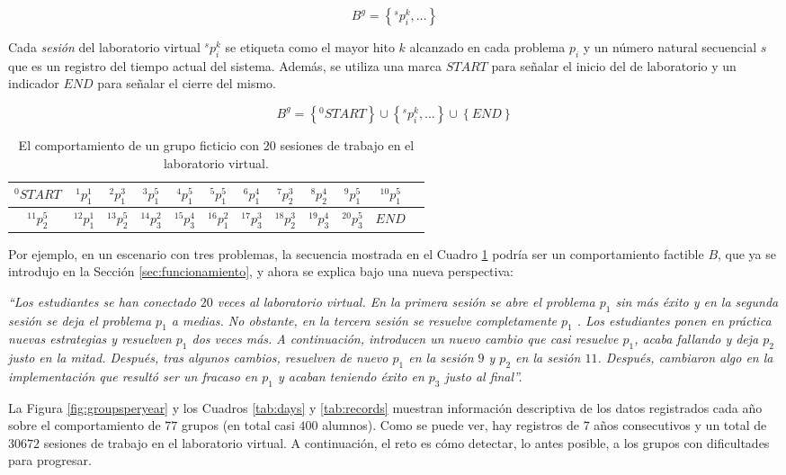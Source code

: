 \begin{equation}
B^g = \left\lbrace ^sp_i^k,\dots \right\rbrace
\end{equation}

Cada \emph{sesión} del laboratorio virtual $^sp_i^k$ se etiqueta como el mayor hito $k$ alcanzado en cada problema $p_i$ y un número natural secuencial $s$ que es un registro del tiempo actual del sistema. Además, se utiliza una marca $START$ para señalar el inicio del de laboratorio y un indicador $END$ para señalar el cierre del mismo.

\begin{equation}
B^g = \left\lbrace ^0START \right\rbrace \cup \left\lbrace ^sp_i^k,\dots \right\rbrace \cup \left\lbrace END \right\rbrace
\end{equation}

\begin{table}[H]
\centering
\caption{El comportamiento de un grupo ficticio con $20$ sesiones de trabajo en el laboratorio virtual.}
\label{tab:sequence}
\begin{tabular}{cccccccccccc}
$^0START$ & $^1p_1^1$ & $^2p_1^3$ & $^3p_1^5$ & $^4p_1^5$ & $^5p_1^5$ & $^6p_1^4$ & $^7p_2^3$ & $^8p_2^4$ & $^9p_1^5$ & $^{10}p_1^5$ \\ \hline
$^{11}p_2^5$  & $^{12}p_1^1$ & $^{13}p_2^5$ & $^{14}p_3^2$ & $^{15}p_3^4$ & $^{16}p_1^2$ & $^{17}p_3^3$ & $^{18}p_2^3$ & $^{19}p_3^4$ & $^{20}p_3^5$ & $END$
\end{tabular}
\end{table}

Por ejemplo, en un escenario con tres problemas, la secuencia mostrada en el Cuadro \ref{tab:sequence} podría ser un comportamiento factible $B$, que ya se introdujo en la Sección \ref{sec:funcionamiento}, y ahora se explica bajo una nueva perspectiva:

\emph{``Los estudiantes se han conectado $20$ veces al laboratorio virtual. En la primera sesión se abre el problema $p_1$ sin más éxito y en la segunda sesión se deja el problema $p_1$ a medias. No obstante, en la tercera sesión se resuelve completamente $p_1$ . Los estudiantes ponen en práctica nuevas estrategias y resuelven $p_1$ dos veces más. A continuación, introducen un nuevo cambio que casi resuelve $p_1$, acaba fallando y deja $p_2$ justo en la mitad. Después, tras algunos cambios, resuelven de nuevo $p_1$ en la sesión $9$ y $p_2$ en la sesión $11$. Después, cambiaron algo en la implementación que resultó ser un fracaso en $p_1$ y acaban teniendo éxito en $p_3$ justo al final''.}

La Figura \ref{fig:groupsperyear} y los Cuadros \ref{tab:days} y \ref{tab:records} muestran información descriptiva de los datos registrados cada año sobre el comportamiento de $77$ grupos (en total casi $400$ alumnos). Como se puede ver, hay registros de $7$ años consecutivos y un total de $30672$ sesiones de trabajo en el laboratorio virtual. A continuación, el reto es cómo detectar, lo antes posible, a los grupos con dificultades para progresar.